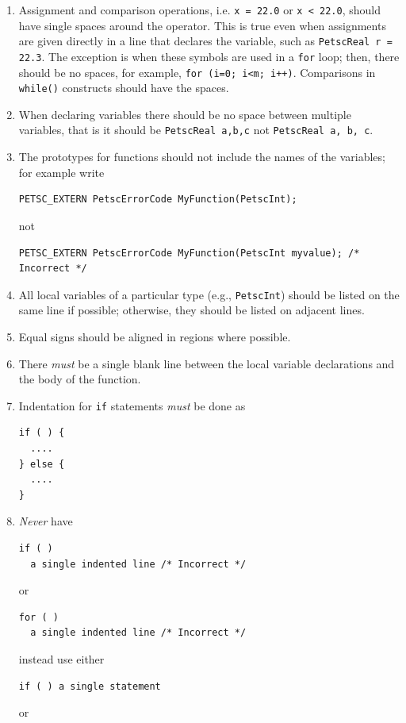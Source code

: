 \begin{enumerate}
\item Assignment and comparison operations, i.e. \lstinline{x = 22.0} or
\lstinline{x < 22.0}, should have single spaces around the operator.
This is true even when assignments are given directly in a line that declares
the variable, such as \lstinline{PetscReal r = 22.3}. The exception is when
these symbols are used in a \lstinline{for} loop; then, there should be no spaces,
for example, \lstinline{for (i=0; i<m; i++)}. Comparisons in \lstinline{while()}
constructs should have the spaces.
\item When declaring variables there should be no space between multiple variables, that is it should be \lstinline{PetscReal a,b,c} not \lstinline{PetscReal a, b, c}.
\item The prototypes for functions should not include the names of the variables; for example write
\begin{lstlisting}
PETSC_EXTERN PetscErrorCode MyFunction(PetscInt);
\end{lstlisting}
not
\begin{lstlisting}
PETSC_EXTERN PetscErrorCode MyFunction(PetscInt myvalue); /* Incorrect */
\end{lstlisting}
\item All local variables of a particular type (e.g., \lstinline{PetscInt}) should be
      listed on the same line if possible; otherwise, they should be listed
      on adjacent lines.
\item Equal signs should be aligned in regions where possible.
\item There {\em must} be a single blank line
      between the local variable declarations and the body of the function.
\item Indentation for \lstinline{if} statements {\em must}  be done  as
\begin{lstlisting}
if ( ) {
  ....
} else {
  ....
}
\end{lstlisting}
\item {\em Never} have
\begin{lstlisting}
if ( )
  a single indented line /* Incorrect */
\end{lstlisting}
or
\begin{lstlisting}
for ( )
  a single indented line /* Incorrect */
\end{lstlisting}
instead use either
\begin{lstlisting}
if ( ) a single statement
\end{lstlisting}
or
\begin{lstlisting}

\end{lstlisting}
\end{enumerate}
